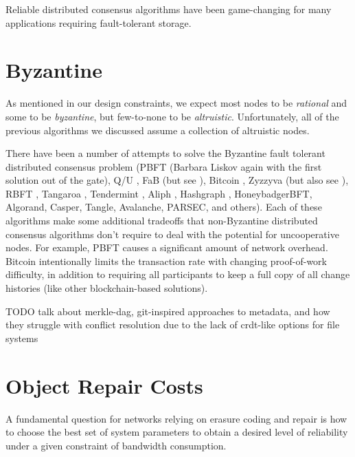 \documentclass[11pt,fleqn,openany]{book}
\newcommand{\todo}[1]{{\color{red} TODO #1 }}
\begin{document}
Reliable distributed consensus algorithms have been game-changing for many
applications requiring fault-tolerant storage.

\section{Byzantine}

As mentioned in our design constraints, we expect most nodes to be {\em
rational} and some to be {\em byzantine}, but few-to-none to be {\em
altruistic}. Unfortunately, all of the previous algorithms we discussed assume a
collection of altruistic nodes.

There have been a number of attempts to solve the Byzantine fault tolerant
distributed consensus problem
(PBFT \cite{pbft} (Barbara Liskov again with the
first solution out of the gate), Q/U \cite{qu}, FaB \cite{fab} (but see
\cite{fab-revisited}), Bitcoin \cite{bitcoin}, Zyzzyva \cite{zyzzyva} (but also
see \cite{fab-revisited}), RBFT \cite{rbft}, Tangaroa \cite{tangaroa},
Tendermint \cite{tendermint}, Aliph \cite{aliph}, Hashgraph \cite{hashgraph},
HoneybadgerBFT\cite{honeybadger}, Algorand\cite{algorand}, Casper\cite{casper},
Tangle\cite{tangle}, Avalanche\cite{avalanche}, PARSEC\cite{parsec}, and
others\cite{mickens-bft}).
Each of these algorithms make some
additional tradeoffs that non-Byzantine distributed consensus algorithms don't
require to deal with the potential for uncooperative nodes. For example,
PBFT \cite{pbft} causes a significant amount of network overhead. Bitcoin
\cite{bitcoin} intentionally limits the transaction rate with changing
proof-of-work difficulty, in addition to requiring all participants to keep a
full copy of all change histories (like other blockchain-based
solutions).

\todo{talk about merkle-dag, git-inspired approaches to metadata, and how
they struggle with conflict resolution due to the lack of crdt-like options for
file systems}

\section{Object Repair Costs}

A fundamental question for networks relying on erasure coding and repair is
how to choose the best set of system parameters to obtain a desired level of
reliability under a given constraint of bandwidth consumption.

\newpage

\begingroup
\raggedright

\endgroup
\end{document}
